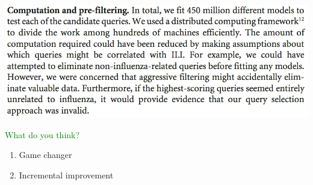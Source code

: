 \documentclass[aspectratio=169]{beamer}
\begin{document}
\begin{frame}

\begin{center}
\includegraphics[width=\textwidth]{figures/ginsberg_detecting_2009_filtering}
\end{center}

\end{frame}
\begin{frame}

\textcolor{green}{What do you think?}
\begin{enumerate}
\item Game changer
\item Incremental improvement
\end{enumerate}

\end{frame}
\end{document}
